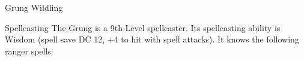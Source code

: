 \begin{DndMonster}[width=0.5\textwidth]{Grung Wildling}
	\begin{DndMonsterSpells}
		\item[Spellcasting] The Grung is a 9th-Level spellcaster. Its spellcasting ability is Wisdom (spell save DC 12, +4 to hit with spell attacks). It knows the following ranger spells:
	\end{DndMonsterSpells}
\end{DndMonster}